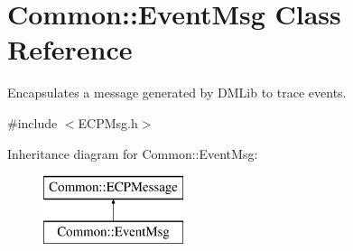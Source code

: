 \hypertarget{class_common_1_1_event_msg}{\section{Common\-:\-:Event\-Msg Class Reference}
\label{class_common_1_1_event_msg}
}


Encapsulates a message generated by D\-M\-Lib to trace events.  




{\ttfamily \#include $<$E\-C\-P\-Msg.\-h$>$}

Inheritance diagram for Common\-:\-:Event\-Msg\-:\begin{figure}[H]
\begin{center}
\leavevmode
\includegraphics[height=2.000000cm]{class_common_1_1_event_msg}
\end{center}
\end{figure}
